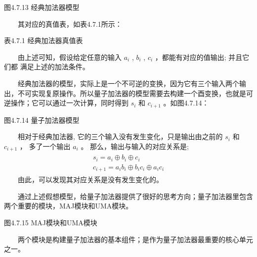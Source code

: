 \documentclass[a4paper,11pt,english]{sphinxmanual}
\begin{document}
\begin{center}图4.7.13 经典加法器模型
\end{center}
\sphinxAtStartPar
  其对应的真值表，如表4.7.1所示：

\begin{center}表4.7.1 经典加法器真值表
\end{center}

\sphinxAtStartPar
  由上述可知，假设给定任意的输入  \(a_{i}\) ,  \(b_{i}\) ,  \(c_{i}\) ，都能有对应的值输出; 并且它们都 满足上述的加法条件。

\sphinxAtStartPar
{}

\sphinxAtStartPar
  经典加法器的模型，实际上是一个不可逆的变换，因为它有三个输入两个输出，不可实现复原操作。所以量子加法器的模型需要去构建一个酉变换，也就是可逆操作；它可以通过一次计算，同时得到  \(s_{i}\) 和  \(c_{i+1}\) 。如图4.7.14：


\begin{center}图4.7.14 量子加法器模型
\end{center}
\sphinxAtStartPar
  相对于经典加法器, 它的三个输入没有发生变化，只是输出由之前的  \(s_{i}\) 和  \(c_{i+1}\) ， 多了一个输出  \(a_{i}\) 。 那么，输出与输入的对应关系是;
\begin{equation*}
\begin{split}\begin{array}{c} s_{i}=a_{i} \oplus b_{i} \oplus c_{i} \\ c_{i+1}=a_{i} b_{i} \oplus b_{i} c_{i} \oplus a_{i} c_{i} \end{array}\end{split}
\end{equation*}
\sphinxAtStartPar
  由此，可以发现其对应关系是没有发生变化的。

\sphinxAtStartPar
  通过上述假想模型，给量子加法器提供了很好的思考方向；量子加法器里包含两个重要的模块，MAJ模块和UMA模块。


\begin{center}图4.7.15 MAJ模块和UMA模块
\end{center}
\sphinxAtStartPar
  两个模块是构建量子加法器的基本组件；是作为量子加法器最重要的核心单元之一。
\end{document}
